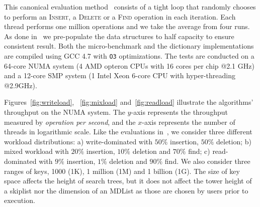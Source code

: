 \documentclass[10pt,conference,compsocconf]{IEEEtran}
\begin{document}
This canonical evaluation method~\cite{harris2001pragmatic,dick2014logarithmic,natarajan2014fast} consists of a tight loop that randomly chooses to perform an \textsc{Insert}, a \textsc{Delete} or a \textsc{Find} operation in each iteration. 
Each thread performs one million operations and we take the average from four runs.
As done in~\cite{natarajan2014fast,brown2014general} we pre-populate the data structures to half capacity to ensure consistent result.
Both the micro-benchmark and the dictionary implementations are compiled using GCC 4.7 with \texttt{O3} optimizations.
The tests are conducted on a 64-core NUMA system (4 AMD opteron CPUs with 16 cores per chip @2.1 GHz) and a 12-core SMP system (1 Intel Xeon 6-core CPU with hyper-threading @2.9GHz). 

Figures~\ref{fig:writeload}, ~\ref{fig:mixload} and~\ref{fig:readload} illustrate the algorithms' throughput on the NUMA system.
The $y$-axis represents the throughput measured by \emph{operation per second}, and the $x$-axis represents the number of threads in logarithmic scale.
Like the evaluations in~\cite{natarajan2014fast,howley2012non}, we consider three different workload distributions: a) write-dominated with $50\%$ insertion, $50\%$ deletion; b) mixed workload with $20\%$ insertion, $10\%$ deletion and $70\%$ find; c) read-dominated with $9\%$ insertion, $1\%$ deletion and $90\%$ find.
We also consider three ranges of keys, 1000 (1K), 1 million (1M) and 1 billion (1G). 
The size of key space affects the height of search trees, but it does not affect the tower height of a skiplist nor the dimension of an MDList as those are chosen by users prior to execution.
\end{document}
